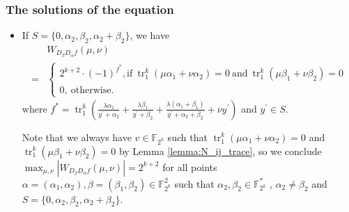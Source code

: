 \documentclass[
    aspectratio=169,                   %
]{beamer}
\newcommand{\Fks}{\mathbb{F}_{2^k}^*}
\newcommand{\Fk}{\mathbb{F}_{2^k}}
\newcommand{\tr}{\operatorname{tr}_1^k}
\begin{document}
    \begin{frame}
        \frametitle{The solutions of the equation}
    
        \begin{itemize}
            \item If $ S=\{0,\alpha_2,\beta_2,\alpha_2+\beta_2\} $, we have
            \begin{align*}
                &W_{D_{\beta}D_{\alpha}f}(\mu,\nu)\\
                =&\begin{cases}
                    2^{k+2}\cdot(-1)^{f^*},\text{if}~\tr\left(\mu\alpha_1+\nu\alpha_2\right)=0 ~
                    \text{and}~\tr\left(\mu\beta_1+\nu\beta_2\right)=0 \\
                    0,~\text{otherwise.}
                \end{cases}
            \end{align*}
            where $ f^* = \tr\left(\frac{\lambda\alpha_1}{y^{\prime}+\alpha_2}+\frac{\lambda\beta_1}{y^{\prime}+\beta_2}+\frac{\lambda(\alpha_1+\beta_1)}{y^{\prime}+\alpha_2+\beta_2}+\nu y^{\prime}\right) $ and $ y^{\prime}\in S $.
            
            Note that we always have $ v\in\Fk $ such that $ \tr\left(\mu\alpha_1+\nu\alpha_2\right)=0 $ 
            and $\tr\left(\mu\beta_1+\nu\beta_2\right)=0 $ by Lemma \eqref{lemma:N_ij_trace}, 
            so we conclude $ \max_{\mu,\nu}|W_{D_{\beta}D_{\alpha}f}(\mu,\nu)|= 2^{k+2} $
            for all points $ \alpha=(\alpha_1,\alpha_2),\beta=(\beta_1,\beta_2)\in\Fk^2 $ such that $ \alpha_2,\beta_2\in\Fks $ 
            , $ \alpha_2\ne\beta_2 $ and $ S=\{0,\alpha_2,\beta_2,\alpha_2+\beta_2\} $. 
        \end{itemize}
    
    \end{frame}
\end{document}
